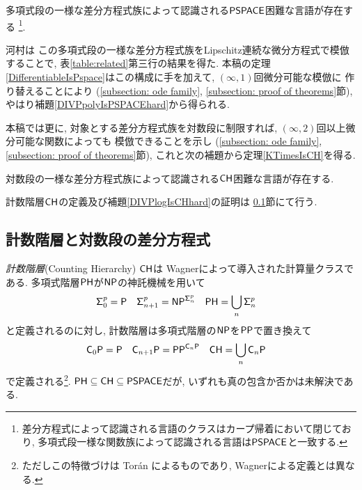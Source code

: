 \begin{lemma}
 \label{DIVPpolyIsPSPACEhard}
 多項式段の一様な差分方程式族によって認識される$\mathsf{PSPACE}$困難な言語が存在する
 \footnote{差分方程式によって認識される言語のクラスはカープ帰着において閉じており,
多項式段一様な関数族によって認識される言語は$\mathsf{PSPACE}$と一致する.}.
\end{lemma}

河村\cite{kawamura2010lipschitz}は
この多項式段の一様な差分方程式族をLipschitz連続な微分方程式で模倣することで, 
表\ref{table:related}第三行の結果を得た. 
本稿の定理\ref{DifferentiableIsPspace}はこの構成に手を加えて, 
$(\infty, 1)$回微分可能な模倣に
作り替えることにより
(\ref{subsection: ode family}, \ref{subsection: proof of theorems}節), 
やはり補題\ref{DIVPpolyIsPSPACEhard}から得られる. 

本稿では更に, 対象とする差分方程式族を対数段に制限すれば, 
$(\infty, 2)$回以上微分可能な関数によっても
模倣できることを示し
(\ref{subsection: ode family}, \ref{subsection: proof of theorems}節), 
これと次の補題から定理\ref{KTimesIsCH}を得る. 

\begin{lemma}
 \label{DIVPlogIsCHhard}
 対数段の一様な差分方程式族によって認識される$\mathsf{CH}$困難な言語が存在する.
\end{lemma}

計数階層$\mathsf{CH}$の定義及び補題\ref{DIVPlogIsCHhard}の証明は
\ref{subsection: counting hierarchy}節にて行う.

\subsection{計数階層と対数段の差分方程式}
\label{subsection: counting hierarchy}

\emph{計数階層}\kern\xkanjiskip(Counting Hierarchy) $\mathsf{CH}$は
Wagnerによって導入された計算量クラスである\cite{wagner1986complexity}.
多項式階層$\mathsf{PH}$が$\mathsf{NP}$の神託機械を用いて
\begin{align*}
 \mathsf{\Sigma}^p_0  &= \mathsf{P}
 &
 \mathsf{\Sigma}^p_{n+1} &= \mathsf{NP} ^{\mathsf{\Sigma}^p_n}
 &
 \mathsf{PH} &= \bigcup_n \mathsf{\Sigma}^p_n
\end{align*}
と定義されるのに対し,
計数階層は多項式階層の$\mathsf{NP}$を$\mathsf{PP}$で置き換えて
\begin{align*}
 \mathsf{C}_0 \mathsf{P}  &= \mathsf{P}
 &
 \mathsf{C}_{n+1} \mathsf{P} &= \mathsf{PP}^{\mathsf{C}_n \mathsf{P}}
 &
 \mathsf{CH} &= \bigcup_n \mathsf{C}_n \mathsf{P}
\end{align*}
で定義される\footnote{ただしこの特徴づけは Tor{\'a}n によるものであり,
Wagnerによる定義とは異なる\cite{toran1991complexity}.
}. $\mathsf{PH} \subseteq \mathsf{CH} \subseteq \mathsf{PSPACE}$だが,
いずれも真の包含か否かは未解決である.


